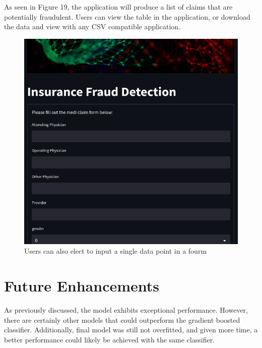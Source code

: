 \documentclass[twoside,11pt]{article}
\begin{document}
As seen in Figure 19, the application will produce a list of claims that are potentially
fraudulent. Users can view the table in the application, or download the data and view
with any CSV compatible application.
\begin{figure}[!ht]
  \centering
  \includegraphics[width=\textwidth]{./img/streamlit3.png}
  \caption{Users can also elect to input a single data point in a fourm}
\end{figure}
\clearpage
\section{Future Enhancements}
As previously discussed, the model exhibits exceptional performance. However,
there are certainly other models that could outperform the
gradient boosted classifier. Additionally, final model was still not overfitted,
and given more time, a better performance could likely be achieved with the same classifier.




\clearpage
\end{document}
